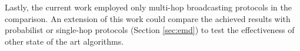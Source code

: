 		
		Lastly, the current work employed only multi-hop broadcasting protocols in the comparison. An extension of this work could compare the achieved results with probabilist or single-hop protocols (Section \ref{sec:emd}) to test the effectiveness of other state of the art algorithms.
		
		
%
%
